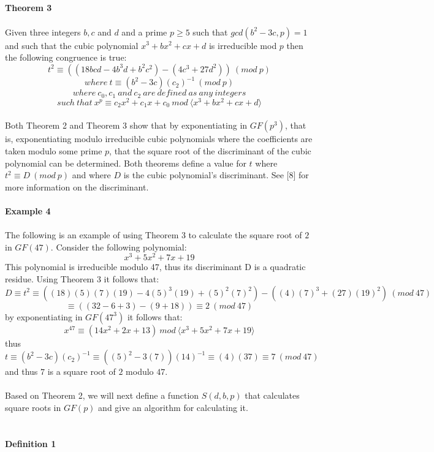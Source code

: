 \documentclass[final,letterpaper,oneside,10pt]{article}
\begin{document}
\\
\\
\\
\\
\textbf{Theorem 3}
\\
\\
Given three integers $b,c$ and $d$ and a prime $p \ge 5$ such that $gcd(b^2-3c,p)=1$
and such that the cubic polynomial $x^3+bx^2+cx+d$ is irreducible mod $p$
then the following congruence is true:
\\
\[t^2 \equiv ((18bcd-4b^3d+b^2c^2)-(4c^3+27d^2))~(mod~p)\]
\[where~ t \equiv (b^2-3c)(c_2)^{-1}~(mod~p)\]
\[where~ c_0, c_1~ and~ c_2 ~are~ defined~ as ~any~integers\]
\[such~that~x^p \equiv c_2x^2 + c_1x + c_0~ mod~ \langle x^3 + bx^2 + cx + d \rangle\]
\\
Both Theorem 2 and Theorem 3 show that by exponentiating in $GF(p^3)$, that is, exponentiating modulo irreducible cubic polynomials where the
coefficients are taken modulo some prime $p$, that the square root of the discriminant of the cubic polynomial can be determined.  Both theorems  
define a value for $t$ where $t^2 \equiv D~(mod~p)$ and where $D$ is the cubic polynomial's discriminant.  See [8] for more information on 
the discriminant.
\\
\\
\textbf{Example 4}
\\
\\
The following is an example of using Theorem 3 to calculate the square root of $2$ in $GF(47)$.  Consider the following polynomial:
\[x^3+5x^2+7x+19\]
This polynomial is irreducible modulo 47, thus its discriminant D is a quadratic residue.  Using Theorem 3 it follows that:
\[D \equiv t^2 \equiv ((18)(5)(7)(19) - 4(5)^3(19)+(5)^2(7)^2)-((4)(7)^3+(27)(19)^2)~(mod~47)\]
\[\equiv ((32-6+3)-(9+18)) \equiv 2~(mod~47)\]
by exponentiating in $GF(47^3)$ it follows that:
\[x^{47} \equiv (14x^2+2x+13) ~mod~ \langle x^3 + 5x^2 + 7x + 19 \rangle \]
thus
\[t \equiv (b^2-3c)(c_2)^{-1} \equiv ((5)^2 - 3(7))(14)^{-1} \equiv (4)(37) \equiv 7~(mod~47) \]
and thus $7$ is a square root of $2$ modulo $47$.
\\
\\
Based on Theorem 2, we will next define a function $S(d,b,p)$ that calculates square roots in $GF(p)$ and give an algorithm for calculating it.
\\
\\
\\
\textbf{Definition 1}
\\
\\
\end{document}
